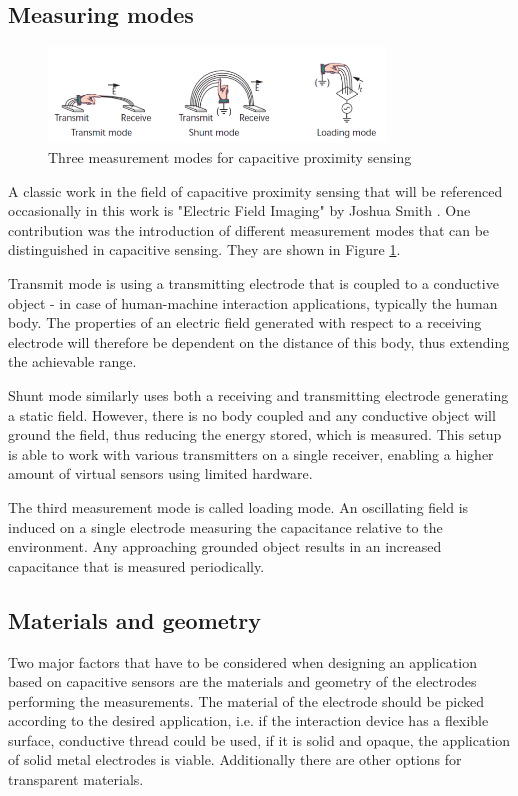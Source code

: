 \subsection{Measuring modes}
\begin{figure} [h]
\centering
\includegraphics[width=0.8\textwidth]{images/cap_sensing_modes.png} 
\caption{Three measurement modes for capacitive proximity sensing \cite{Smith1996a}}
\label{fig:cap_sensing_modes}
\end{figure}
A classic work in the field of capacitive proximity sensing that will be referenced occasionally in this work is "Electric Field Imaging" by Joshua Smith \cite{smith1999thesis}. One contribution was the introduction of different measurement modes that can be distinguished in capacitive sensing. They are shown in Figure \ref{fig:cap_sensing_modes}. 

Transmit mode is using a transmitting electrode that is coupled to a conductive object - in case of human-machine interaction applications, typically the human body. The properties of an electric field generated with respect to a receiving electrode will therefore be dependent on the distance of this body, thus extending the achievable range.

Shunt mode similarly uses both a receiving and transmitting electrode generating a static field. However, there is no body coupled and any conductive object will ground the field, thus reducing the energy stored, which is measured. This setup is able to work with various transmitters on a single receiver, enabling a higher amount of virtual sensors using limited hardware. 

The third measurement mode is called loading mode. An oscillating field is induced on a single electrode measuring the capacitance relative to the environment. Any approaching grounded object results in an increased capacitance that is measured periodically.
\subsection{Materials and geometry}
Two major factors that have to be considered when designing an application based on capacitive sensors are the materials and geometry of the electrodes performing the measurements. The material of the electrode should be picked according to the desired application, i.e. if the interaction device has a flexible surface, conductive thread could be used, if it is solid and opaque, the application of solid metal electrodes is viable. Additionally there are other options for transparent materials. 


